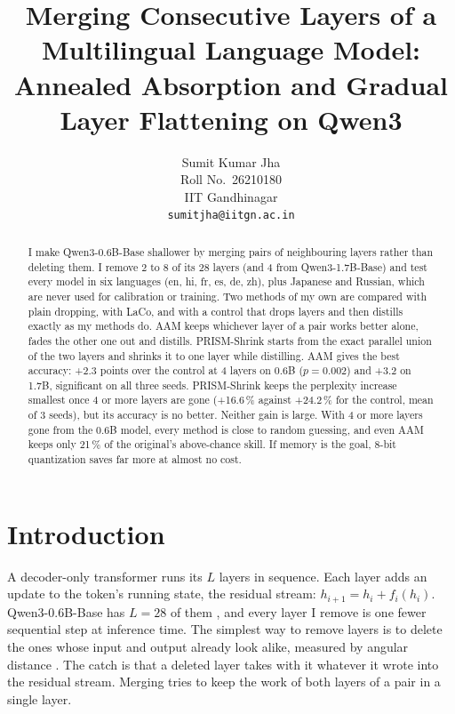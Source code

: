 \documentclass[11pt]{article}
\title{Merging Consecutive Layers of a Multilingual Language Model:\\
Annealed Absorption and Gradual Layer Flattening on Qwen3}
\author{Sumit Kumar Jha \\
  Roll No.\ 26210180 \\
  IIT Gandhinagar \\
  \texttt{sumitjha@iitgn.ac.in}}
\begin{document}
\maketitle

\begin{abstract}

I make Qwen3-0.6B-Base shallower by merging pairs of neighbouring layers rather than deleting them. I remove 2 to 8
of its 28 layers (and 4 from Qwen3-1.7B-Base) and test every model in six languages (en, hi, fr, es, de, zh), plus
Japanese and Russian, which are never used for calibration or training. Two methods of my own are compared with
plain dropping, with LaCo, and with a control that drops layers and then distills exactly as my methods do. AAM keeps
whichever layer of a pair works better alone, fades the other one out and distills. PRISM-Shrink starts from the
exact parallel union of the two layers and shrinks it to one layer while distilling. AAM gives the best accuracy:
+2.3 points over the control at 4 layers on 0.6B ($p=0.002$) and +3.2 on 1.7B, significant on all three seeds.
PRISM-Shrink keeps the perplexity increase smallest once 4 or more layers are gone (+16.6\,\% against +24.2\,\% for
the control, mean of 3 seeds), but its accuracy is no better. Neither gain is large. With 4 or more layers gone from
the 0.6B model, every method is close to random guessing, and even AAM keeps only 21\,\% of the original's
above-chance skill. If memory is the goal, 8-bit quantization saves far more at almost no cost.
\end{abstract}

\section{Introduction}

A decoder-only transformer runs its $L$ layers in sequence. Each layer adds an update to the token's running state,
the residual stream: $h_{i+1} = h_i + f_i(h_i)$. Qwen3-0.6B-Base has $L=28$ of them \citep{qwen3}, and every layer I
remove is one fewer sequential step at inference time. The simplest way to remove layers is to delete the ones whose
input and output already look alike, measured by angular distance \citep{gromov2024,shortgpt}. The catch is that a
deleted layer takes with it whatever it wrote into the residual stream. Merging tries to keep the work of both layers
of a pair in a single layer.
\end{document}
